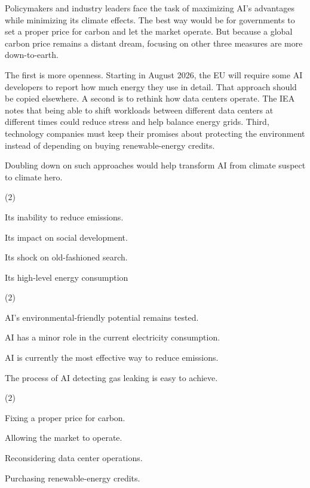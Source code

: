 \documentclass{英语试卷}
\begin{document}
\par Policymakers and industry leaders face the task of maximizing AI's advantages while minimizing its climate effects. The best way would be for governments to set a proper price for carbon and let the market operate. But because a global carbon price remains a distant dream, focusing on other three measures are more down-to-earth.\par
\par The first is more openness. Starting in August 2026, the EU will require some AI developers to report how much energy they use in detail. That approach should be copied elsewhere. A second is to rethink how data centers operate. The IEA notes that being able to shift workloads between different data centers at different times could reduce stress and help balance energy grids. Third, technology companies must keep their promises about protecting the environment instead of depending on buying renewable-energy credits.\par
\par Doubling down on such approaches would help transform AI from climate suspect to climate hero.\par
{}
\begin{choices}(2)
  \item Its inability to reduce emissions.
  \item Its impact on social development.
  \item Its shock on old-fashioned search.
  \item Its high-level energy consumption
\end{choices}
\begin{choices}(2)
  \item AI's environmental-friendly potential remains tested.
  \item AI has a minor role in the current electricity consumption.
  \item AI is currently the most effective way to reduce emissions.
  \item The process of AI detecting gas leaking is easy to achieve.
\end{choices}
\begin{choices}(2)
  \item Fixing a proper price for carbon.
  \item Allowing the market to operate.
  \item Reconsidering data center operations.
  \item Purchasing renewable-energy credits.
\end{choices}
\end{document}
